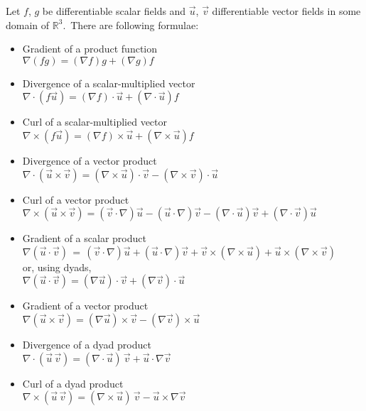 \documentclass[12pt]{article}
\theoremstyle{definition}
\begin{document}
Let $f$, $g$ be differentiable scalar fields and $\vec{u}$, $\vec{v}$  differentiable vector fields in some domain of $\mathbb{R}^3$.\, There are following formulae:

\begin{itemize}

\item Gradient of a product function\\
$\nabla(fg) = (\nabla f)g+(\nabla g)f$

\item Divergence of a scalar-multiplied vector\\
$\nabla\cdot(f\vec{u}) = (\nabla f)\cdot\vec{u}+(\nabla\cdot\vec{u})f$

\item Curl of a scalar-multiplied vector\\
$\nabla\!\times\!(f\vec{u}) = (\nabla f)\times\vec{u}+(\nabla\!\times\!\vec{u})f$

\item Divergence of a vector product\\
$\nabla\cdot(\vec{u}\!\times\!\vec{v}) = 
  (\nabla\!\times\!\vec{u})\cdot\vec{v}-(\nabla\!\times\!\vec{v})\cdot\vec{u}$

\item Curl of a vector product\\
$\nabla\!\times\!(\vec{u}\!\times\!\vec{v}) = 
(\vec{v}\cdot\nabla)\vec{u}-(\vec{u}\cdot\nabla)\vec{v}
-(\nabla\cdot\vec{u})\vec{v}+(\nabla\cdot\vec{v})\vec{u}$

\item Gradient of a scalar product\\
$\nabla(\vec{u}\cdot\vec{v})\, =\, 
(\vec{v}\cdot\nabla)\vec{u}+(\vec{u}\cdot\nabla)\vec{v}
+\vec{v}\!\times\!(\nabla\!\times\!\vec{u})
+\vec{u}\!\times\!(\nabla\!\times\!\vec{v})$\\
or, using dyads,\\
$\nabla(\vec{u}\cdot\vec{v}) = (\nabla\vec{u})\cdot\vec{v}+(\nabla\vec{v})\cdot\vec{u}$

\item Gradient of a vector product\\
$\nabla(\vec{u}\!\times\!\vec{v}) = (\nabla\vec{u})\!\times\!\vec{v}-(\nabla\vec{v})\!\times\!\vec{u}$

\item Divergence of a dyad product\\
$\nabla\cdot(\vec{u}\,\vec{v}) = 
(\nabla\!\cdot\!\vec{u})\,\vec{v}+\vec{u}\cdot\nabla\vec{v}$

\item Curl of a dyad product\\
$\nabla\!\times\!(\vec{u}\,\vec{v}) = 
(\nabla\!\times\!\vec{u})\,\vec{v}-\vec{u}\times\!\nabla\vec{v}$
\end{itemize}
\end{document}
